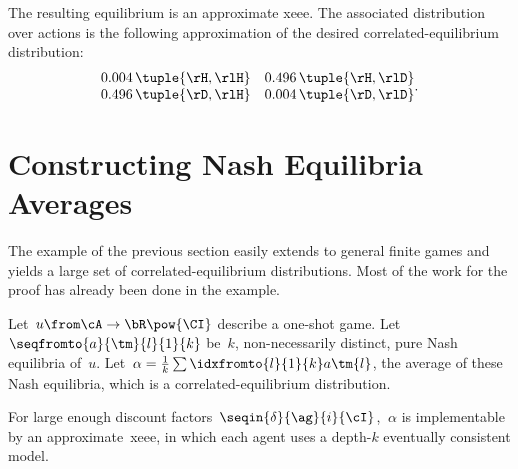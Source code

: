 The resulting equilibrium is an approximate \ac{xeee}.
The associated distribution over actions is the following approximation of the desired correlated-equilibrium distribution:
\[
\begin{matrix}
0.004 \, \tuple{\rH, \rlH} & 0.496 \, \tuple{\rH, \rlD} \\
0.496 \, \tuple{\rD, \rlH} & 0.004 \, \tuple{\rD, \rlD}
\end{matrix}.
\]


\section{Constructing Nash Equilibria Averages}
\label{sec:constructing_nash_equilibria_averages}

The example of the previous section easily extends to general finite games and yields a large set of correlated-equilibrium distributions.
Most of the work for the proof has already been done in the example.

\begin{theorem}
\label{res:xeee_and_ce}
Let~\(u \from \cA \to \bR\pow{\CI}\) describe a one-shot game.
Let~\(\seqfromto{a}{\tm}{l}{1}{k}\) be~\(k\), non-necessarily distinct, pure Nash equilibria of~\(u\).
Let~\(\alpha = \frac{1}{k} \sum\idxfromto{l}{1}{k} a\tm{l}\), the average of these Nash equilibria, which is a correlated-equilibrium distribution.

For large enough discount factors~\(\seqin{\delta}{\ag}{i}{\cI}\), \(~\alpha\) is implementable by an approximate~\ac{xeee}, in which each agent uses a depth-\(k\) eventually consistent model.
\end{theorem}

